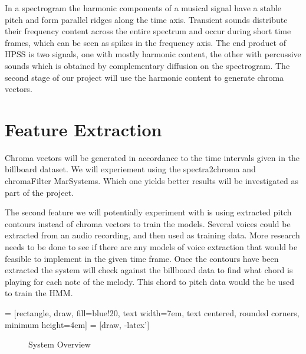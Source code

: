 \documentclass{article}
\begin{document}
In a spectrogram the harmonic components of a musical signal have a stable
pitch and form parallel ridges along the time axis. Transient sounds distribute
their frequency content across the entire spectrum and occur during short time
frames, which can be seen as spikes in the frequency axis. The end product of
HPSS is two signals, one with mostly harmonic content, the other with
percussive sounds which is obtained by complementary diffusion on the
spectrogram. The second stage of our project will use the harmonic content to
generate chroma vectors.

\section{Feature Extraction}

Chroma vectors will be generated in accordance to the time intervals given in
the billboard dataset.  We will experiement using the spectra2chroma and
chromaFilter MarSystems. Which one yields better results will be investigated
as part of the project.

The second feature we will potentially experiment with is using extracted pitch
contours instead of chroma vectors to train the models. Several voices could be
extracted from an audio recording, and then used as training data. More
research needs to be done to see if there are any models of voice extraction
that would be feasible to implement in the given time frame. Once the contours
have been extracted the system will check against the billboard data to find
what chord is playing for each note of the melody.  This chord to pitch data
would the be used to train the HMM.

 = [rectangle, draw, fill=blue!20,
    text width=7em, text centered, rounded corners, minimum height=4em]
 = [draw, -latex']

\begin{figure}
\caption{System Overview}
\end{figure}
\end{document}
